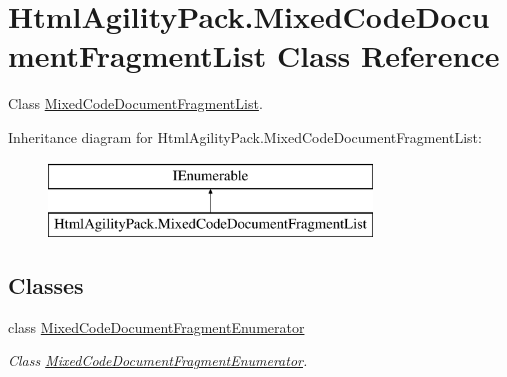 \hypertarget{class_html_agility_pack_1_1_mixed_code_document_fragment_list}{}\section{Html\+Agility\+Pack.\+Mixed\+Code\+Document\+Fragment\+List Class Reference}
\label{class_html_agility_pack_1_1_mixed_code_document_fragment_list}


Class \hyperlink{class_html_agility_pack_1_1_mixed_code_document_fragment_list}{Mixed\+Code\+Document\+Fragment\+List}.  


Inheritance diagram for Html\+Agility\+Pack.\+Mixed\+Code\+Document\+Fragment\+List\+:\begin{figure}[H]
\begin{center}
\leavevmode
\includegraphics[height=2.000000cm]{class_html_agility_pack_1_1_mixed_code_document_fragment_list}
\end{center}
\end{figure}
\subsection*{Classes}
\begin{DoxyCompactItemize}
\item 
class \hyperlink{class_html_agility_pack_1_1_mixed_code_document_fragment_list_1_1_mixed_code_document_fragment_enumerator}{Mixed\+Code\+Document\+Fragment\+Enumerator}
\begin{DoxyCompactList}\small\item\em Class \hyperlink{class_html_agility_pack_1_1_mixed_code_document_fragment_list_1_1_mixed_code_document_fragment_enumerator}{Mixed\+Code\+Document\+Fragment\+Enumerator}. \end{DoxyCompactList}\end{DoxyCompactItemize}
